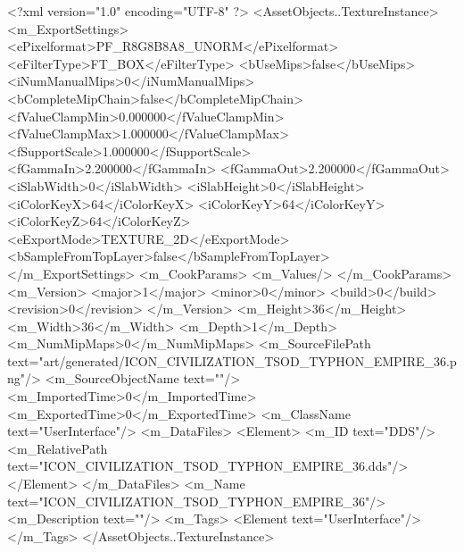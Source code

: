 <?xml version="1.0" encoding="UTF-8" ?>
<AssetObjects..TextureInstance>
	<m_ExportSettings>
		<ePixelformat>PF_R8G8B8A8_UNORM</ePixelformat>
		<eFilterType>FT_BOX</eFilterType>
		<bUseMips>false</bUseMips>
		<iNumManualMips>0</iNumManualMips>
		<bCompleteMipChain>false</bCompleteMipChain>
		<fValueClampMin>0.000000</fValueClampMin>
		<fValueClampMax>1.000000</fValueClampMax>
		<fSupportScale>1.000000</fSupportScale>
		<fGammaIn>2.200000</fGammaIn>
		<fGammaOut>2.200000</fGammaOut>
		<iSlabWidth>0</iSlabWidth>
		<iSlabHeight>0</iSlabHeight>
		<iColorKeyX>64</iColorKeyX>
		<iColorKeyY>64</iColorKeyY>
		<iColorKeyZ>64</iColorKeyZ>
		<eExportMode>TEXTURE_2D</eExportMode>
		<bSampleFromTopLayer>false</bSampleFromTopLayer>
	</m_ExportSettings>
	<m_CookParams>
		<m_Values/>
	</m_CookParams>
	<m_Version>
		<major>1</major>
		<minor>0</minor>
		<build>0</build>
		<revision>0</revision>
	</m_Version>
	<m_Height>36</m_Height>
	<m_Width>36</m_Width>
	<m_Depth>1</m_Depth>
	<m_NumMipMaps>0</m_NumMipMaps>
	<m_SourceFilePath text="art/generated/ICON_CIVILIZATION_TSOD_TYPHON_EMPIRE_36.png"/>
	<m_SourceObjectName text=""/>
	<m_ImportedTime>0</m_ImportedTime>
	<m_ExportedTime>0</m_ExportedTime>
	<m_ClassName text="UserInterface"/>
	<m_DataFiles>
		<Element>
			<m_ID text="DDS"/>
			<m_RelativePath text="ICON_CIVILIZATION_TSOD_TYPHON_EMPIRE_36.dds"/>
		</Element>
	</m_DataFiles>
	<m_Name text="ICON_CIVILIZATION_TSOD_TYPHON_EMPIRE_36"/>
	<m_Description text=""/>
	<m_Tags>
		<Element text="UserInterface"/>
	</m_Tags>
</AssetObjects..TextureInstance>
